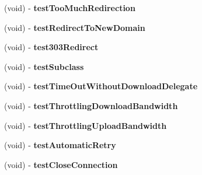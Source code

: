 \begin{DoxyCompactItemize}
\item 
\hypertarget{interface_a_s_i_h_t_t_p_request_tests_abdde777c6d2c53c38bbbd414f01ab11c}{
(void) -\/ {\bfseries test\-Too\-Much\-Redirection}}
\label{interface_a_s_i_h_t_t_p_request_tests_abdde777c6d2c53c38bbbd414f01ab11c}

\item 
\hypertarget{interface_a_s_i_h_t_t_p_request_tests_a0e46e6d0e9b2075145255c89cb0f23ae}{
(void) -\/ {\bfseries test\-Redirect\-To\-New\-Domain}}
\label{interface_a_s_i_h_t_t_p_request_tests_a0e46e6d0e9b2075145255c89cb0f23ae}

\item 
\hypertarget{interface_a_s_i_h_t_t_p_request_tests_a486f80b7859c2c3ea72e06a28fdcf789}{
(void) -\/ {\bfseries test303\-Redirect}}
\label{interface_a_s_i_h_t_t_p_request_tests_a486f80b7859c2c3ea72e06a28fdcf789}

\item 
\hypertarget{interface_a_s_i_h_t_t_p_request_tests_aeb6e4b4f2fc9f3a74b3cd2a6c42341d5}{
(void) -\/ {\bfseries test\-Subclass}}
\label{interface_a_s_i_h_t_t_p_request_tests_aeb6e4b4f2fc9f3a74b3cd2a6c42341d5}

\item 
\hypertarget{interface_a_s_i_h_t_t_p_request_tests_ae19beb94bca46a1dcb81e4729dc89f2f}{
(void) -\/ {\bfseries test\-Time\-Out\-Without\-Download\-Delegate}}
\label{interface_a_s_i_h_t_t_p_request_tests_ae19beb94bca46a1dcb81e4729dc89f2f}

\item 
\hypertarget{interface_a_s_i_h_t_t_p_request_tests_af14e80be1ca16f71c636a799356bb92d}{
(void) -\/ {\bfseries test\-Throttling\-Download\-Bandwidth}}
\label{interface_a_s_i_h_t_t_p_request_tests_af14e80be1ca16f71c636a799356bb92d}

\item 
\hypertarget{interface_a_s_i_h_t_t_p_request_tests_a65f252fc1eea28887974dd1ff8354609}{
(void) -\/ {\bfseries test\-Throttling\-Upload\-Bandwidth}}
\label{interface_a_s_i_h_t_t_p_request_tests_a65f252fc1eea28887974dd1ff8354609}

\item 
\hypertarget{interface_a_s_i_h_t_t_p_request_tests_aed737183009eb013ed056fb74423c9ab}{
(void) -\/ {\bfseries test\-Automatic\-Retry}}
\label{interface_a_s_i_h_t_t_p_request_tests_aed737183009eb013ed056fb74423c9ab}

\item 
\hypertarget{interface_a_s_i_h_t_t_p_request_tests_a266591fd53dafdd64e6b175e59f1439c}{
(void) -\/ {\bfseries test\-Close\-Connection}}
\label{interface_a_s_i_h_t_t_p_request_tests_a266591fd53dafdd64e6b175e59f1439c}


\end{DoxyCompactItemize}
